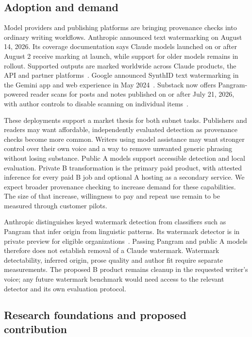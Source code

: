 \subsection{Adoption and demand}\label{adoption-and-demand}

Model providers and publishing platforms are bringing provenance checks
into ordinary writing workflows. Anthropic announced text watermarking
on August 14, 2026. Its coverage documentation says Claude models
launched on or after August 2 receive marking at launch, while support
for older models remains in rollout. Supported outputs are marked
worldwide across Claude products, the API and partner
platforms~\cite{claudewatermark,claudemarking}. Google announced SynthID text
watermarking in the Gemini app and web experience in May
2024~\cite{synthidtext}. Substack now offers Pangram-powered reader
scans for posts and notes published on or after July 21, 2026, with
author controls to disable scanning on individual
items~\cite{substackdetection}.

These deployments support a market thesis for both subnet tasks.
Publishers and readers may want affordable, independently evaluated
detection as provenance checks become more common. Writers using model
assistance may want stronger control over their own voice and a way to
remove unwanted generic phrasing without losing substance. Public A
models support accessible detection and local evaluation. Private B
transformation is the primary paid product, with attested inference for
every paid B job and optional A hosting as a secondary service. We expect broader
provenance checking to increase demand for these capabilities. The
size of that increase, willingness to pay and repeat use remain to be
measured through customer pilots.

Anthropic distinguishes keyed watermark detection from classifiers
such as Pangram that infer origin from linguistic patterns. Its
watermark detector is in private preview for eligible
organizations~\cite{claudewatermark}. Passing Pangram and public A
models therefore does not establish removal of a Claude watermark.
Watermark detectability, inferred origin, prose quality and author fit
require separate measurements. The proposed B product remains cleanup
in the requested writer's voice; any future watermark benchmark would
need access to the relevant detector and its own evaluation protocol.

\subsection{Research foundations and proposed contribution}\label{related-research}

